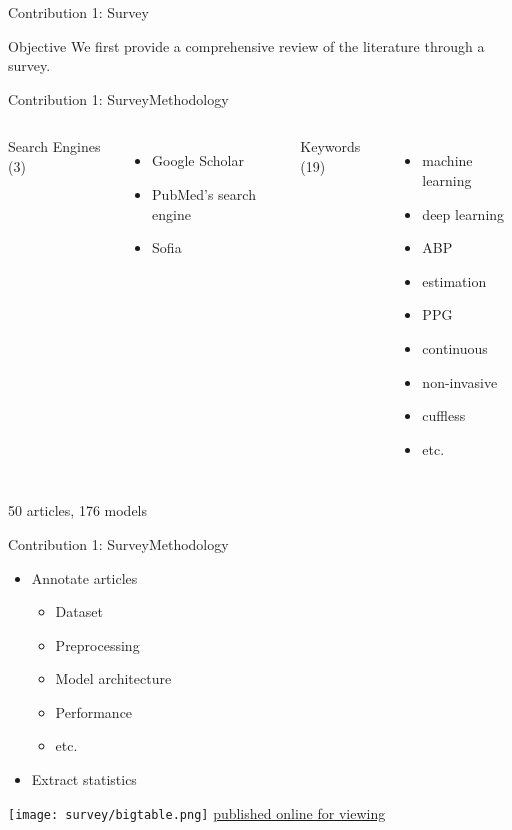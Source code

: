 \begin{frame}{Contribution 1: Survey}
    \begin{block}{Objective}
        We first provide a comprehensive review of the literature through a survey.
    \end{block}
\end{frame}

\begin{frame}{Contribution 1: Survey}{Methodology}
    \begin{columns}
        Search Engines (3)
        \begin{itemize}
            \item Google Scholar
            \item PubMed's search engine
            \item Sofia
        \end{itemize}

        Keywords (19)
        \begin{itemize}
            \item machine learning
            \item deep learning
            \item ABP
            \item estimation
            \item PPG
            \item continuous
            \item non-invasive
            \item cuffless
            \item etc.
        \end{itemize}
    \end{columns}

    \pause
    \vspace{1cm}
    \centering
    \alert{50 articles, 176 models}
\end{frame}

\begin{frame}{Contribution 1: Survey}{Methodology}
    \begin{itemize}
        \item Annotate articles
              \begin{itemize}
                  \item Dataset
                  \item Preprocessing
                  \item Model architecture
                  \item Performance
                  \item etc.
              \end{itemize}
        \item Extract statistics
    \end{itemize}
    \texttt{[image: survey/bigtable.png]}
    \href{https://docs.google.com/spreadsheets/u/1/d/e/2PACX-1vR-3MoAcaD-N30ZM15ozSlxh8RHTUBv2KETb9f2g852htlH-5PNt_S8khVnUFLWeEo2H91ZW9hCEi8o/pubhtml}{published online for viewing}
\end{frame}


